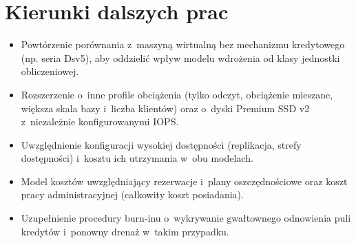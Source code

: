 \section{Kierunki dalszych prac}
\label{sec:podsumowanie-dalsze}

\begin{itemize}
  \item Powtórzenie porównania z~maszyną wirtualną bez mechanizmu kredytowego (np. seria
  Dsv5), aby oddzielić wpływ modelu wdrożenia od klasy jednostki obliczeniowej.
  \item Rozszerzenie o~inne profile obciążenia (tylko odczyt, obciążenie mieszane, większa skala
  bazy i~liczba klientów) oraz o~dyski Premium SSD v2 z~niezależnie konfigurowanymi IOPS.
  \item Uwzględnienie konfiguracji wysokiej dostępności (replikacja, strefy dostępności)
  i~kosztu ich utrzymania w~obu modelach.
  \item Model kosztów uwzględniający rezerwacje i~plany oszczędnościowe oraz koszt pracy
  administracyjnej (całkowity koszt posiadania).
  \item Uzupełnienie procedury burn-inu o~wykrywanie gwałtownego odnowienia puli kredytów
  i~ponowny drenaż w~takim przypadku.
\end{itemize}
